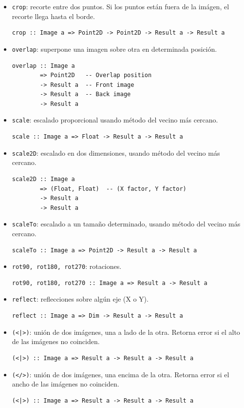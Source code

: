 \documentclass[a4paper, 11pt]{article} %
\begin{document}
	\begin{itemize} 
		\item \texttt{crop}: recorte entre dos puntos. Si los puntos están fuera de la imágen, el recorte llega hasta el borde.
\begin{lstlisting}
crop :: Image a => Point2D -> Point2D -> Result a -> Result a
\end{lstlisting}
		\item \texttt{overlap}: superpone una imagen sobre otra en determinada posición.
\begin{lstlisting}
overlap :: Image a 
        => Point2D   -- Overlap position
        -> Result a  -- Front image
        -> Result a  -- Back image
        -> Result a
\end{lstlisting}
		\item \texttt{scale}: escalado proporcional usando método del vecino más cercano.
\begin{lstlisting}
scale :: Image a => Float -> Result a -> Result a
\end{lstlisting}
		\item \texttt{scale2D}: escalado en dos dimensiones, usando método del vecino más cercano.
\begin{lstlisting}
scale2D :: Image a 
        => (Float, Float)  -- (X factor, Y factor)
        -> Result a 
        -> Result a
\end{lstlisting}
		\item \texttt{scaleTo}: escalado a un tamaño determinado, usando método del vecino más cercano.
\begin{lstlisting}
scaleTo :: Image a => Point2D -> Result a -> Result a
\end{lstlisting}
		\item \texttt{rot90, rot180, rot270}: rotaciones.
\begin{lstlisting}
rot90, rot180, rot270 :: Image a => Result a -> Result a
\end{lstlisting}
\pagebreak
		\item \texttt{reflect}: reflecciones sobre algún eje (X o Y).
\begin{lstlisting}
reflect :: Image a => Dim -> Result a -> Result a
\end{lstlisting}
		\item \texttt{(<|>)}: unión de dos imágenes, una a lado de la otra. Retorna error si el alto de las imágenes no coinciden.
\begin{lstlisting}
(<|>) :: Image a => Result a -> Result a -> Result a
\end{lstlisting}
		\item \texttt{(</>)}: unión de dos imágenes, una encima de la otra. Retorna error si el ancho de las imágenes no coinciden.
\begin{lstlisting}
(<|>) :: Image a => Result a -> Result a -> Result a
\end{lstlisting}

	\end{itemize}
	
\end{document}
